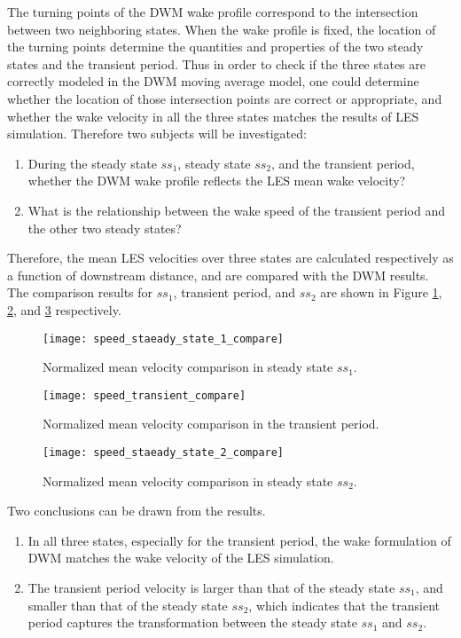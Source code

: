 \documentclass{umthesis}
\begin{document}
The turning points of the DWM wake profile correspond to the intersection between two neighboring states. When the wake profile is fixed, the location of the turning points determine the quantities and properties of the two steady states and the transient period. Thus in order to check if the three states are correctly modeled in the DWM moving average model, one could determine whether the location of those intersection points are correct or appropriate, and whether the wake velocity in all the three states matches the results of LES simulation. Therefore two subjects will be investigated:

\begin{enumerate}
  \item During the steady state $ss_1$, steady state $ss_2$, and the transient period, whether the DWM wake profile reflects the LES mean wake velocity?
  \item What is the relationship between the wake speed of the transient period and the other two steady states?
\end{enumerate}


Therefore, the mean LES velocities over three states are calculated respectively as a function of downstream distance, and are compared with the DWM results. The comparison results for $ss_1$, transient period, and $ss_2$ are shown in Figure \ref{fig:speed_staeady_state_1_compare}, \ref{fig:speed_transient_compare}, and \ref{fig:speed_staeady_state_2_compare} respectively.

\begin{figure}
  \centering
  \texttt{[image: speed\_staeady\_state\_1\_compare]}
  \caption{Normalized mean velocity comparison in steady state $ss_1$.}\label{fig:speed_staeady_state_1_compare}
\end{figure}

\begin{figure}
  \centering
  \texttt{[image: speed\_transient\_compare]}
  \caption{Normalized mean velocity comparison in the transient period.}\label{fig:speed_transient_compare}
\end{figure}

\begin{figure}
  \centering
  \texttt{[image: speed\_staeady\_state\_2\_compare]}
  \caption{Normalized mean velocity comparison in steady state $ss_2$.}\label{fig:speed_staeady_state_2_compare}
\end{figure}

Two conclusions can be drawn from the results.
\begin{enumerate}
  \item In all three states, especially for the transient period, the wake formulation of DWM matches the wake velocity of the LES simulation.  
  \item The transient period velocity is larger than that of the steady state $ss_1$, and smaller than that of the steady state $ss_2$, which indicates that the transient period captures the transformation between the steady state $ss_1$ and $ss_2$.
\end{enumerate}
\end{document}
